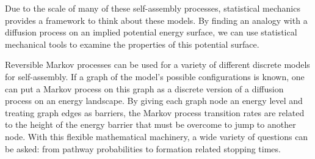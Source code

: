 %
%
%

Due to the scale of many of these self-assembly processes, statistical mechanics provides a framework to think about these models. By finding an analogy with a diffusion process on an implied potential energy surface, we can use statistical mechanical tools to examine the properties of this potential surface. 

Reversible Markov processes can be used for a variety of different discrete models for self-assembly. If a graph of the model's possible configurations is known, one can put a Markov process on this graph as a discrete version of a diffusion process on an energy landscape. By giving each graph node an energy level and treating graph edges as barriers, the Markov process transition rates are related to the height of the energy barrier that must be overcome to jump to another node. With this flexible mathematical machinery, a wide variety of questions can be asked: from pathway probabilities to formation related stopping times.


